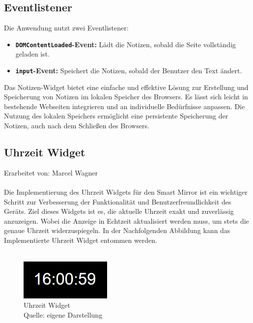 \subsection*{Eventlistener}
Die Anwendung nutzt zwei Eventlistener:

\begin{itemize}
    \item \textbf{\texttt{DOMContentLoaded}-Event:}
    Lädt die Notizen, sobald die Seite vollständig geladen ist.
    
    \item \textbf{\texttt{input}-Event:}
    Speichert die Notizen, sobald der Benutzer den Text ändert.
\end{itemize}

\noindent
Das Notizen-Widget bietet eine einfache und effektive Lösung zur Erstellung und Speicherung von Notizen im lokalen Speicher des Browsers. Es lässt sich leicht in bestehende Webseiten integrieren und an individuelle Bedürfnisse anpassen. Die Nutzung des lokalen Speichers ermöglicht eine persistente Speicherung der Notizen, auch nach dem Schließen des Browsers.


\subsection{Uhrzeit Widget}
Erarbeitet von: Marcel Wagner \\ \\
\noindent
Die Implementierung des Uhrzeit Widgets für den Smart Mirror ist ein wichtiger Schritt zur Verbesserung der Funktionalität und Benutzerfreundlichkeit des Geräts. Ziel dieses Widgets ist es, die aktuelle Uhrzeit exakt und zuverlässig anzuzeigen. Wobei die Anzeige in Echtzeit aktualisiert werden muss, um stets die genaue Uhrzeit widerzuspiegeln. In der Nachfolgenden Abbildung kann das Implementierte Uhrzeit Widget entommen werden.\\ \\

\begin{figure}[h]
    \centering
    \includegraphics[width=0.4\textwidth]{pictures/time_widget.png}
  \captionsetup{justification=centering, labelformat=simple, singlelinecheck=false}
    \caption[Uhrzeit Widget]{Uhrzeit Widget\\ Quelle: eigene Darstellung}
\end{figure}

